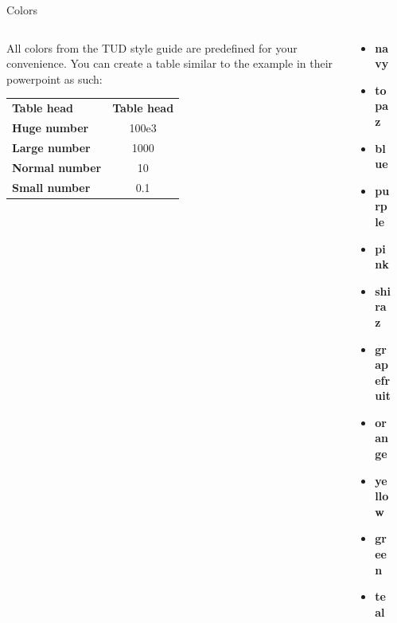 \begin{frame}[t]{Colors}
  \begin{columns}[T, onlytextwidth]
    \begin{column}{0.5\textwidth}
      All colors from the TUD style guide are predefined for your convenience.
      You can create a table similar to the example in their powerpoint as such:\\[1ex]
      
      \renewcommand{\arraystretch}{1.4}
      \newcommand{\thead}{\color{white}\bfseries} %
      \begin{tabular}{>{\color{primary}\bfseries}l|S}
        \thead Table head & {\thead Table head} \\
        Huge number & 100e3 \\
        Large number & 1000\\
        Normal number & 10\\
        Small number & 0.1\\
      \end{tabular}
    \end{column}
    \begin{column}{0.25\textwidth}
      \begin{itemize}
        \item \textcolor{tud navy}{\textbf{navy}}
        \item \textcolor{tud topaz}{\textbf{topaz}}
        \item \textcolor{tud blue}{\textbf{blue}}
        \item \textcolor{tud purple}{\textbf{purple}}
        \item \textcolor{tud pink}{\textbf{pink}}
        \item \textcolor{tud shiraz}{\textbf{shiraz}}
        \item \textcolor{tud grapefruit}{\textbf{grapefruit}}
        \item \textcolor{tud orange}{\textbf{orange}}
        \item \textcolor{tud yellow}{\textbf{yellow}}
        \item \textcolor{tud green}{\textbf{green}}
        \item \textcolor{tud teal}{\textbf{teal}}
      \end{itemize}
    \end{column}
    \begin{column}{0.25\textwidth}
      \begin{itemize}

\end{itemize}
\end{column}
\end{columns}
\end{frame}
